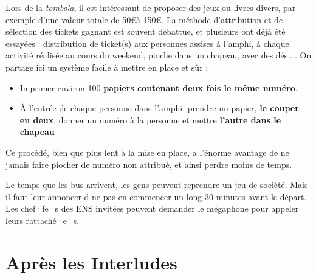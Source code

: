 \begin{center}
\end{center}


Lors de la \emph{tombola}, il est intéressant de proposer des jeux ou livres divers, par exemple d'une valeur totale de 50\euro à 150\euro. La méthode d'attribution et de sélection des tickets gagnant est souvent débattue, et plusieurs ont déjà été essayées : distribution de ticket(s) aux personnes assises à l'amphi, à chaque activité réalisée au cours du weekend, pioche dans un chapeau, avec des dés,... On partage ici un système facile à mettre en place et sûr :

\begin{itemize}
    \item Imprimer environ 100 \textbf{papiers contenant deux fois le même numéro}.
    \item À l'entrée de chaque personne dans l'amphi, prendre un papier, \textbf{le couper en deux}, donner un numéro à la personne et mettre \textbf{l'autre dans le chapeau}
\end{itemize}

Ce procédé, bien que plus lent à la mise en place, a l'énorme avantage de ne jamais faire piocher de numéro non attribué, et ainsi perdre moins de temps.


Le temps que les bus arrivent, les gens peuvent reprendre un jeu de société. Mais il faut leur annoncer d ne pas en commencer un long 30 minutes avant le départ. Les chef·fe·s des ENS invitées peuvent demander le mégaphone pour appeler leurs rattaché·e·s.

\section{Après les Interludes}

